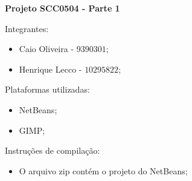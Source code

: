 \documentclass[12pt]{article}
\begin{document}
\noindent
\textbf{Projeto SCC0504 - Parte 1}

\bigskip
\noindent
Integrantes:
\begin{itemize}
	\item Caio Oliveira - $9390301$;
	\item Henrique Lecco - $10295822$;
\end{itemize}

\bigskip
\noindent
Plataformas utilizadas:
\begin{itemize}
	\item NetBeans;
	\item GIMP;
\end{itemize}

\bigskip
\noindent
Instruções de compilação:
\begin{itemize}
	\item O arquivo zip contém o projeto do NetBeans;
\end{itemize}
\end{document}
